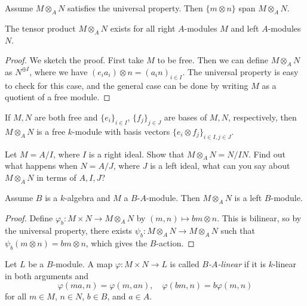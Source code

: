 \begin{corollary}
  Assume $M \otimes_A N$ satisfies
  the universal property. Then
  $\{m \otimes n\}$ span $M \otimes_A N$.
\end{corollary}

\begin{theorem}
  The tensor product $M \otimes_A N$
  exists for all right $A$-modules $M$
  and left $A$-modules $N$.
\end{theorem}

\begin{proof}
  We sketch the proof. First take
  $M$ to be free. Then we can define
  $M \otimes_A N$ as $N^{\oplus I}$,
  where we have
  $(e_i a_i) \otimes n = (a_i n)_{i \in I}$.
  The universal property is easy to check
  for this case, and the general
  case can be done by writing $M$ as
  a quotient of a free module.
\end{proof}

\begin{example}
  If $M, N$ are both free and
  $\{e_i\}_{i \in I}$, $\{f_j\}_{j \in J}$
  are bases of $M, N$, respectively,
  then $M \otimes_A N$ is a free
  $k$-module with basis vectors
  $\{e_i \otimes f_j\}_{i \in I, j \in J}$.
\end{example}

\begin{exercise}
  Let $M = A / I$, where $I$ is a right
  ideal. Show that
  $M \otimes_A N = N / IN$. Find out
  what happens when $N = A / J$, where
  $J$ is a left ideal, what can you say
  about $M \otimes_A N$ in terms of
  $A, I, J$?
\end{exercise}

\begin{prop}
  Assume $B$ is a $k$-algebra and
  $M$ a $B$-$A$-module. Then
  $M \otimes_A N$ is a left $B$-module.
\end{prop}

\begin{proof}
  Define $\varphi_b : M \times N \to M \otimes_A N$
  by $(m, n) \mapsto bm \otimes n$.
  This is bilinear, so by the universal
  property, there exists
  $\psi_b : M \otimes_A N \to M \otimes_A N$
  such that $\psi_b(m \otimes n) = bm \otimes n$, which gives
  the $B$-action.
\end{proof}

\begin{definition}
  Let $L$ be a $B$-module. A map
  $\varphi : M \times N \to L$ is
  called \emph{$B$-$A$-linear} if it
  is $k$-linear in both arguments and
  \[
    \varphi(ma, n) = \varphi(m, an), \quad
    \varphi(bm, n) = b \varphi(m, n)
  \]
  for all $m \in M$, $n \in N$, $b \in B$,
  and $a \in A$.
\end{definition}

